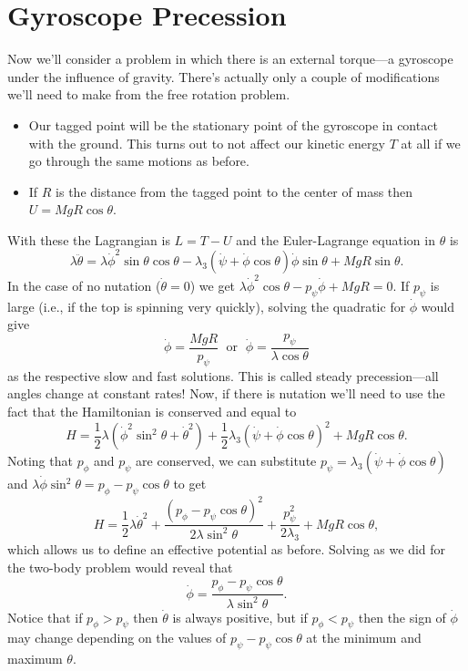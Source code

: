 \documentclass[../p111main.tex]{subfiles}
\begin{document}
\section{Gyroscope Precession}
Now we'll consider a problem in which there is an external torque---a gyroscope under the influence of gravity.
There's actually only a couple of modifications we'll need to make from the free rotation problem.
\begin{itemize}[topsep=0pt]
    \item Our tagged point will be the stationary point of the gyroscope in contact with the ground.
    This turns out to not affect our kinetic energy $T$ at all if we go through the same motions as before.

    \item If $R$ is the distance from the tagged point to the center of mass then $U = MgR \cos \theta$.
\end{itemize}
With these the Lagrangian is $L = T - U$ and the Euler-Lagrange equation in $\theta$ is
\[ \lambda \ddot \theta = \lambda \dot \phi^2 \sin \theta \cos \theta - \lambda_3 \left( \dot \psi + \dot \phi \cos \theta \right) \dot \phi \sin \theta + MgR \sin \theta. \]
In the case of no nutation ($\dot \theta = 0$) we get $\lambda \dot \phi^2 \cos \theta - p_\psi \dot \phi + MgR = 0$.
If $p_\psi$ is large (i.e., if the top is spinning very quickly), solving the quadratic for $\dot \phi$ would give
\[ \dot \phi = \frac{MgR}{p_\psi} \;\textrm{ or }\; \dot \phi = \frac{p_\psi}{\lambda \cos \theta} \]
as the respective slow and fast solutions.
This is called steady precession---all angles change at constant rates!
Now, if there is nutation we'll need to use the fact that the Hamiltonian is conserved and equal to
\[ H = \frac{1}{2} \lambda \left( \dot \phi^2 \sin^2 \theta + \dot \theta^2 \right) + \frac{1}{2} \lambda_3 \left( \dot \psi + \dot \phi \cos \theta \right)^2 + MgR \cos \theta.\]
Noting that $p_\phi$ and $p_\psi$ are conserved, we can substitute $p_\psi = \lambda_3 (\dot \psi + \dot \phi \cos \theta)$ and $\lambda \dot \phi \sin^2 \theta = p_\phi - p_\psi \cos \theta$ to get
\[ H = \frac{1}{2} \lambda \dot \theta^2 + \frac{(p_\phi - p_\psi \cos \theta)^2}{2\lambda \sin^2 \theta} + \frac{p_\psi^2}{2\lambda_3} + MgR \cos \theta, \]
which allows us to define an effective potential as before.
Solving as we did for the two-body problem would reveal that
\[ \dot \phi = \frac{p_\phi - p_\psi \cos \theta}{\lambda \sin^2 \theta}. \]
Notice that if $p_\phi > p_\psi$ then $\dot \theta$ is always positive, but if $p_\phi < p_\psi$ then the sign of $\dot \phi$ may change depending on the values of $p_\psi - p_\psi \cos \theta$ at the minimum and maximum $\theta$.
\end{document}
